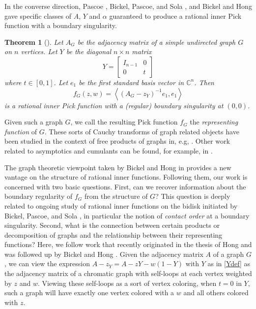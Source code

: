 \documentclass[12pt]{amsart}
\newtheorem{theorem}{Theorem}[section]
\theoremstyle{remark}
\newcommand{\C}{\mathbb{C}}
\newcommand{\ip}[2]{\left\langle #1, #2 \right\rangle}
\newcommand{\inv}{^{-1}}
\newcommand\beq{\begin{equation}}
\newcommand\eeq{\end{equation}}
\newcommand\bbm{\begin{bmatrix}}
\newcommand\ebm{\end{bmatrix}}
\numberwithin{equation}{section}
\begin{document}
In the converse direction, Pascoe \cite{pascoe1}, Bickel, Pascoe, and Sola \cite{bps2}, and Bickel and Hong \cite{bickelhong} gave specific classes of $A$, $Y$ and $\alpha$ guaranteed to produce a rational inner Pick function with a boundary singularity.

\begin{theorem}[\cite{pascoe1, bps2, bickelhong}]\label{blackmagic}
Let $A_G$ be the adjacency matrix of a simple undirected graph $G$ on $n$ vertices. Let $Y$ be the diagonal $n\times n$ matrix 
\beq\label{Ydef}
Y = \bbm I_{n-1} & 0 \\ 0 & t \ebm
\eeq
where $t \in [0,1]$. Let $e_1$ be the first standard basis vector in $\C^n$. Then
\[
f_G(z, w) = \ip{(A_G - z_Y)\inv e_1}{e_1}
\]
is a rational inner Pick function with a (regular) boundary singularity at $(0, 0)$.
\end{theorem}

Given such a graph $G$, we call the resulting Pick function $f_G$ the \emph{representing function} of $G$. These sorts of Cauchy transforms of graph related objects have been studied in the context of free products of graphs in, e.g, \cite{quenell, gutkin, carter}. Other work related to asymptotics and cumulants can be found, for example, in \cite{agax, ahl22}.



The graph theoretic viewpoint taken by Bickel and Hong in \cite{hong, bickelhong} provides a new vantage on the structure of rational inner functions. Following them, our work is concerned with two basic questions. First, can we recover information about the boundary regularity of $f_G$ from the structure of $G$? This question is deeply related to ongoing study of rational inner functions on the bidisk initiated by Bickel, Pascoe, and Sola \cite{bps1, bps2}, in particular the notion of \emph{contact order} at a boundary singularity. Second, what is the connection between certain products or decomposition of graphs and the relationship between their representing functions? Here, we follow work that recently originated in the thesis of Hong \cite{hong} and was followed up by Bickel and Hong \cite{bickelhong}.  Given the adjacency matrix $A$ of a graph $G$, we can view the expression $A - z_Y = A - zY - w(1-Y)$ with $Y$ as in \eqref{Ydef} as the adjacency matrix of a chromatic graph with self-loops at each vertex weighted by $z$ and $w$. Viewing these self-loops as a sort of vertex coloring, when $t = 0$ in $Y$, such a graph will have exactly one vertex colored with a $w$ and all others colored with $z$.
\end{document}
